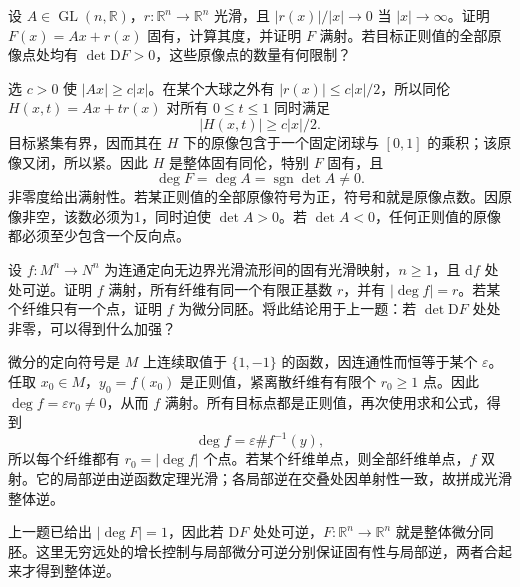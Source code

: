 \begin{exercise}\label{g2:ex:degree-sublinear-perturbation}
	设 \(A\in\operatorname{GL}(n,\mathbb R)\)，\(r:\mathbb R^n\to\mathbb R^n\) 光滑，且 \(|r(x)|/|x|\to0\) 当 \(|x|\to\infty\)。证明 \(F(x)=Ax+r(x)\) 固有，计算其度，并证明 \(F\) 满射。若目标正则值的全部原像点处均有 \(\det\mathrm{D}F>0\)，这些原像点的数量有何限制？
\end{exercise}
\begin{solution}
	选 \(c>0\) 使 \(|Ax|\ge c|x|\)。在某个大球之外有 \(|r(x)|\le c|x|/2\)，所以同伦 \(H(x,t)=Ax+t r(x)\) 对所有 \(0\le t\le1\) 同时满足
	\[
		|H(x,t)|\ge c|x|/2.
	\]
	目标紧集有界，因而其在 \(H\) 下的原像包含于一个固定闭球与 \([0,1]\) 的乘积；该原像又闭，所以紧。因此 \(H\) 是整体固有同伦，特别 \(F\) 固有，且
	\[
		\deg F=\deg A=\operatorname{sgn}\det A\ne0.
	\]
	非零度给出满射性。若某正则值的全部原像符号为正，符号和就是原像点数。因原像非空，该数必须为1，同时迫使 \(\det A>0\)。若 \(\det A<0\)，任何正则值的原像都必须至少包含一个反向点。
\end{solution}

\begin{exercise}\label{g2:ex:proper-local-diffeomorphism-degree}
	设 \(f:M^n\to N^n\) 为连通定向无边界光滑流形间的固有光滑映射，\(n\ge1\)，且 \(\mathrm{d}f\) 处处可逆。证明 \(f\) 满射，所有纤维有同一个有限正基数 \(r\)，并有 \(|\deg f|=r\)。若某个纤维只有一个点，证明 \(f\) 为微分同胚。将此结论用于上一题：若 \(\det\mathrm{D}F\) 处处非零，可以得到什么加强？
\end{exercise}
\begin{solution}
	微分的定向符号是 \(M\) 上连续取值于 \(\{1,-1\}\) 的函数，因连通性而恒等于某个 \(\varepsilon\)。任取 \(x_0\in M\)，\(y_0=f(x_0)\) 是正则值，紧离散纤维有有限个 \(r_0\ge1\) 点。因此 \(\deg f=\varepsilon r_0\ne0\)，从而 \(f\) 满射。所有目标点都是正则值，再次使用求和公式，得到
	\[
		\deg f=\varepsilon\#f^{-1}(y),
	\]
	所以每个纤维都有 \(r_0=|\deg f|\) 个点。若某个纤维单点，则全部纤维单点，\(f\) 双射。它的局部逆由逆函数定理光滑；各局部逆在交叠处因单射性一致，故拼成光滑整体逆。

	上一题已给出 \(|\deg F|=1\)，因此若 \(\mathrm{D}F\) 处处可逆，\(F:\mathbb R^n\to\mathbb R^n\) 就是整体微分同胚。这里无穷远处的增长控制与局部微分可逆分别保证固有性与局部逆，两者合起来才得到整体逆。
\end{solution}

